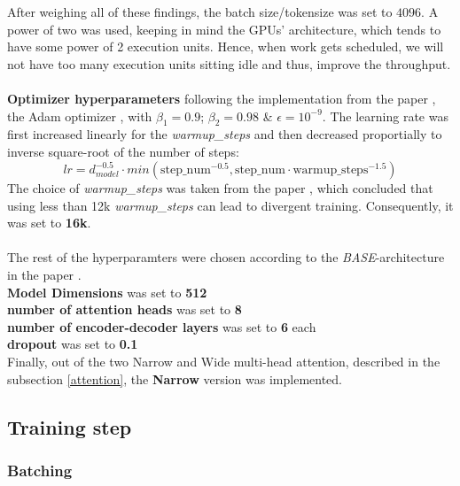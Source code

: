 \documentclass[12pt,a4paper,twoside,openright]{report}
\begin{document}
After weighing all of these findings, the batch size/tokensize was set to $4096$. A power of two was used, keeping in mind the GPUs' architecture, which tends to have some power of 2 execution units. Hence, when work gets scheduled, we will not have too many execution units sitting idle and thus, improve the throughput.
\\\\
\textbf{Optimizer hyperparameters} following the implementation from the paper \cite{transformers}, the Adam optimizer \cite{adam}, with $\beta_1 = 0.9$; $\beta_2=0.98$ \& $\epsilon=10^{-9}$. The learning rate was first increased linearly for the \textit{warmup\_steps} and then decreased proportially to inverse square-root of the number of steps:
\[ lr = d_{model}^{-0.5} \cdot min (\text{step\_num}^{-0.5}, \text{step\_num} \cdot \text{warmup\_steps}^{-1.5}) \]
The choice of \textit{warmup\_steps} was taken from the paper \cite{training-tips}, which concluded that using less than 12k \textit{warmup\_steps} can lead to divergent training. Consequently, it was set to \textbf{16k}.
\\\\
The rest of the hyperparamters were chosen according to the \textit{BASE}-architecture in the paper \cite{transformers}. \\
\textbf{Model Dimensions} was set to \textbf{512}
\\
\textbf{number of attention heads} was set to \textbf{8}
\\
\textbf{number of encoder-decoder layers} was set to \textbf{6} each
\\
\textbf{dropout} was set to \textbf{0.1}
\\
Finally, out of the two Narrow and Wide multi-head attention, described in the subsection \ref{attention}, the \textbf{Narrow} version was implemented.


\subsection{Training step}
\label{training-step}
\subsubsection{Batching}
\end{document}
